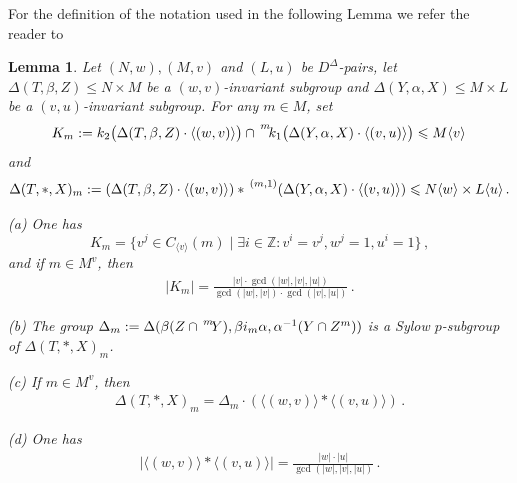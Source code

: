 \documentclass[11pt]{article}
\theoremstyle{change}  %
\newtheorem{lemma}[theorem]{Lemma}  %
\renewcommand{\le}{\leqslant} %
\newcommand{\lexp}[2]{\setbox0=\hbox{$#2$} \setbox1=\vbox to
                 \ht0{}\,\box1^{#1}\!#2}
\newcommand{\ZZ}{\mathbb{Z}}
\newcommand{\DD}{D^{\Delta}}
\newcommand{\Mv}{M\langle v\rangle}
\newcommand{\Nw}{N\langle w\rangle}
\def\Lu{L\langle u\rangle}
\begin{document}
For the definition of the notation used in the following Lemma we refer the reader to \cite[Notations~2.3.19, 2.3.21]{Bouc2010a}

\begin{lemma}\label{lem starproduct}
Let $(N,w), (M,v)$ and $(L,u)$ be $\DD$-pairs, let $\Delta(T,\beta,Z)\le N\times M$ be a $(w,v)$-invariant subgroup and $\Delta(Y,\alpha,X)\le M\times L$ be a $(v,u)$-invariant subgroup. For any $m\in M$, set
\begin{align*}
K_m:=k_2\bigl(\Delta(T,\beta,Z)\cdot \langle (w,v)\rangle\bigr)\cap \lexp{m}{k_1\bigl(\Delta(Y,\alpha,X)\cdot \langle (v,u)\rangle\bigr)}\le \Mv\,
\end{align*}
and
\begin{align*}
\Delta(T,*,X)_m:=\left(\Delta(T,\beta,Z)\cdot \langle (w,v)\rangle\right)*\lexp{(m,1)}{\left(\Delta(Y,\alpha,X)\cdot \langle (v,u)\rangle\right)}\le \Nw\times \Lu\,.
\end{align*}

\smallskip
{\rm (a)} One has
$$ K_m=\{v^j\in C_{\langle v\rangle}(m) \mid \exists i\in\ZZ \colon v^i=v^j, w^j=1, u^i=1\}\,,$$
and if $m\in M^v$, then
\begin{align*}
|K_m|=\frac{|v|\cdot \gcd(|w|,|v|,|u|)}{\gcd(|w|,|v|)\cdot \gcd(|v|,|u|)}\,.
\end{align*}

\smallskip
{\rm (b)} The group $\Delta_m:=\Delta(\beta(Z\cap \lexp{m}Y),\beta i_m\alpha,\alpha^{-1}(Y\cap Z^m))$ is a Sylow $p$-subgroup of $\Delta(T,*,X)_m$.

\smallskip
{\rm (c)} If $m\in M^v$, then
\begin{align*}
\Delta(T,*,X)_m=\Delta_m\cdot \left(\langle (w,v)\rangle *\langle (v,u)\rangle\right)\,.
\end{align*}


\smallskip
{\rm (d)} One has
\begin{align*}
|\langle (w,v)\rangle *\langle (v,u)\rangle|=\frac{|w|\cdot |u|}{\gcd(|w|,|v|,|u|)}\,.
\end{align*}
\end{lemma}
\end{document}
